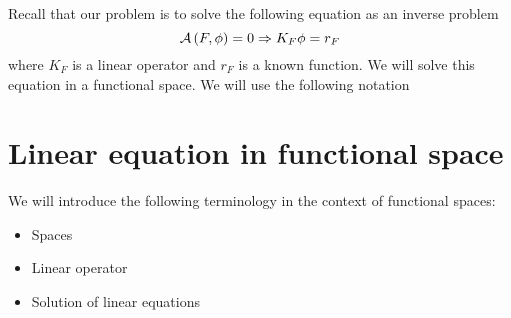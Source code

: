 
Recall that our problem is to solve the following equation as an inverse
problem
\begin{equation*}
    \mathcal{A}\left(F,\phi\right)=0 \Rightarrow K_F\phi=r_F
\end{equation*}
where $K_F$ is a linear operator and $r_F$ is a known function. We will solve this equation in a functional space. We will use the following notation
\section{Linear equation in functional space}
We will introduce the following terminology in the context of functional
spaces:
\begin{itemize}
    \item Spaces
    \item Linear operator
    \item Solution of linear equations
\end{itemize}
